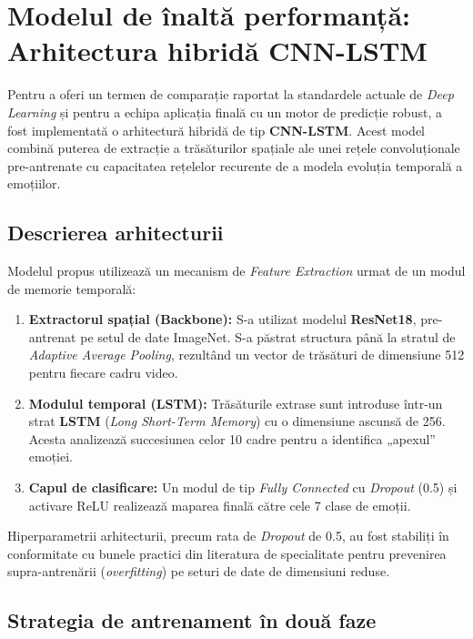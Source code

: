 \section{Modelul de înaltă performanță: Arhitectura hibridă CNN-LSTM}
\label{sc:cnn-lstm}

Pentru a oferi un termen de comparație raportat la standardele actuale de \textit{Deep Learning} și pentru a echipa aplicația finală cu un motor de predicție robust, a fost implementată o arhitectură hibridă de tip \textbf{CNN-LSTM}. Acest model combină puterea de extracție a trăsăturilor spațiale ale unei rețele convoluționale pre-antrenate cu capacitatea rețelelor recurente de a modela evoluția temporală a emoțiilor.

\subsection*{Descrierea arhitecturii}

Modelul propus utilizează un mecanism de \textit{Feature Extraction} urmat de un modul de memorie temporală:
\begin{enumerate}
	\item \textbf{Extractorul spațial (Backbone):} S-a utilizat modelul \textbf{ResNet18}, pre-antrenat pe setul de date ImageNet. S-a păstrat structura până la stratul de \textit{Adaptive Average Pooling}, rezultând un vector de trăsături de dimensiune 512 pentru fiecare cadru video.
	\item \textbf{Modulul temporal (LSTM):} Trăsăturile extrase sunt introduse într-un strat \textbf{LSTM} (\textit{Long Short-Term Memory}) cu o dimensiune ascunsă de 256. Acesta analizează succesiunea celor 10 cadre pentru a identifica „apexul” emoției.
	\item \textbf{Capul de clasificare:} Un modul de tip \textit{Fully Connected} cu \textit{Dropout} (0.5) și activare ReLU realizează maparea finală către cele 7 clase de emoții.
\end{enumerate}
Hiperparametrii arhitecturii, precum rata de \textit{Dropout} de 0.5, au fost stabiliți în conformitate cu bunele practici din literatura de specialitate \cite{srivastava2014dropout} pentru prevenirea supra-antrenării (\textit{overfitting}) pe seturi de date de dimensiuni reduse.

\subsection*{Strategia de antrenament în două faze}

